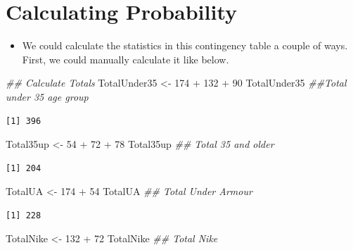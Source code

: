 \documentclass[
  letterpaper,
  DIV=11,
  numbers=noendperiod]{scrreprt}
\newenvironment{Shaded}{\begin{snugshade}}{\end{snugshade}}
\newcommand{\DecValTok}[1]{\textcolor[rgb]{0.68,0.00,0.00}{#1}}
\newcommand{\DocumentationTok}[1]{\textcolor[rgb]{0.37,0.37,0.37}{\textit{#1}}}
\newcommand{\NormalTok}[1]{\textcolor[rgb]{0.00,0.23,0.31}{#1}}
\newcommand{\OtherTok}[1]{\textcolor[rgb]{0.00,0.23,0.31}{#1}}
\newcommand{\SpecialCharTok}[1]{\textcolor[rgb]{0.37,0.37,0.37}{#1}}
\providecommand{\tightlist}{%
  \setlength{\itemsep}{0pt}\setlength{\parskip}{0pt}}\usepackage{longtable,booktabs,array}
\begin{document}
\section{Calculating Probability}\label{calculating-probability}

\begin{itemize}
\tightlist
\item
  We could calculate the statistics in this contingency table a couple
  of ways. First, we could manually calculate it like below.
\end{itemize}

\begin{Shaded}
\begin{Highlighting}[]
\DocumentationTok{\#\# Calculate Totals}
\NormalTok{TotalUnder35 }\OtherTok{\textless{}{-}} \DecValTok{174} \SpecialCharTok{+} \DecValTok{132} \SpecialCharTok{+} \DecValTok{90}
\NormalTok{TotalUnder35  }\DocumentationTok{\#\#Total under 35 age group}
\end{Highlighting}
\end{Shaded}

\begin{verbatim}
[1] 396
\end{verbatim}

\begin{Shaded}
\begin{Highlighting}[]
\NormalTok{Total35up }\OtherTok{\textless{}{-}} \DecValTok{54} \SpecialCharTok{+} \DecValTok{72} \SpecialCharTok{+} \DecValTok{78}
\NormalTok{Total35up  }\DocumentationTok{\#\# Total 35 and older}
\end{Highlighting}
\end{Shaded}

\begin{verbatim}
[1] 204
\end{verbatim}

\begin{Shaded}
\begin{Highlighting}[]
\NormalTok{TotalUA }\OtherTok{\textless{}{-}} \DecValTok{174} \SpecialCharTok{+} \DecValTok{54}
\NormalTok{TotalUA  }\DocumentationTok{\#\# Total Under Armour}
\end{Highlighting}
\end{Shaded}

\begin{verbatim}
[1] 228
\end{verbatim}

\begin{Shaded}
\begin{Highlighting}[]
\NormalTok{TotalNike }\OtherTok{\textless{}{-}} \DecValTok{132} \SpecialCharTok{+} \DecValTok{72}
\NormalTok{TotalNike  }\DocumentationTok{\#\# Total Nike}
\end{Highlighting}
\end{Shaded}
\end{document}

